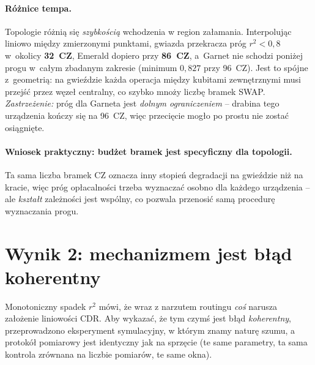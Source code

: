 \documentclass[11pt]{article}
\begin{document}
\paragraph{Różnice tempa.} Topologie różnią się \emph{szybkością} wchodzenia w region załamania.
Interpolując liniowo między zmierzonymi punktami, gwiazda przekracza próg $r^2<0{,}8$ w~okolicy
\textbf{32~CZ}, Emerald dopiero przy \textbf{86~CZ}, a~Garnet nie schodzi poniżej progu w~całym
zbadanym zakresie (minimum $0{,}827$ przy 96~CZ). Jest to spójne z~geometrią: na gwieździe każda
operacja między kubitami zewnętrznymi musi przejść przez węzeł centralny, co szybko mnoży liczbę
bramek SWAP. \emph{Zastrzeżenie:} próg dla Garneta jest \emph{dolnym ograniczeniem} -- drabina tego
urządzenia kończy się na 96~CZ, więc przecięcie mogło po prostu nie zostać osiągnięte.

\paragraph{Wniosek praktyczny: budżet bramek jest specyficzny dla topologii.} Ta sama liczba bramek
CZ oznacza inny stopień degradacji na gwieździe niż na kracie, więc próg opłacalności trzeba
wyznaczać osobno dla każdego urządzenia -- ale \emph{kształt} zależności jest wspólny, co pozwala
przenosić samą procedurę wyznaczania progu.

\section{Wynik 2: mechanizmem jest błąd koherentny}\label{sec:mechanizm}

Monotoniczny spadek $r^2$ mówi, że wraz z narzutem routingu \emph{coś} narusza założenie liniowości
CDR. Aby wykazać, że tym czymś jest błąd \emph{koherentny}, przeprowadzono eksperyment
symulacyjny, w którym znamy naturę szumu, a protokół pomiarowy jest identyczny jak na sprzęcie
(te same parametry, ta sama kontrola zrównana na liczbie pomiarów, te same okna).
\end{document}
